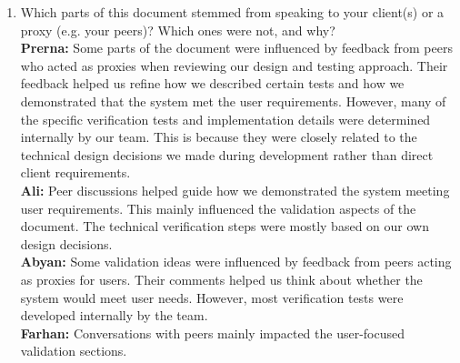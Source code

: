 \documentclass[12pt, titlepage]{article}
\begin{document}
\begin{enumerate}
  \textbf{Ali:} One challenge was making sure each test clearly mapped to a requirement.
Sometimes it was not immediately obvious how they should connect.
We resolved this by reviewing the requirements and adjusting the test descriptions.\\
  \textbf{Abyan:} Because different people wrote different sections, the tone was slightly inconsistent at first.
Some sections were more detailed than others.
We fixed this by reviewing the full document together and editing for consistency.\\
  \textbf{Farhan:} Tracking all the verification and validation activities across the document was a bit confusing.
There were several different tests and requirements to keep organized.
Group discussions helped us clarify what each test was intended to show.\\
  \textbf{Mahad:} It was difficult deciding how much detail to include for each test case.
We did not want the document to become too long or repetitive.
We focused on including the key information needed to understand the tests.\\
  \item Which parts of this document stemmed from speaking to your client(s) or a proxy (e.g. your peers)? Which ones were not, and why?\\
  \textbf{Prerna:} Some parts of the document were influenced by feedback from peers who acted as proxies when reviewing our design and testing approach. Their feedback helped us refine how we described certain tests and how we demonstrated that the system met the user requirements. However, many of the specific verification tests and implementation details were determined internally by our team. This is because they were closely related to the technical design decisions we made during development rather than direct client requirements.\\
  \textbf{Ali:} Peer discussions helped guide how we demonstrated the system meeting user requirements.
This mainly influenced the validation aspects of the document.
The technical verification steps were mostly based on our own design decisions. \\
  \textbf{Abyan:} Some validation ideas were influenced by feedback from peers acting as proxies for users.
Their comments helped us think about whether the system would meet user needs.
However, most verification tests were developed internally by the team.\\
  \textbf{Farhan:} Conversations with peers mainly impacted the user-focused validation sections.

\end{enumerate}
\end{document}
